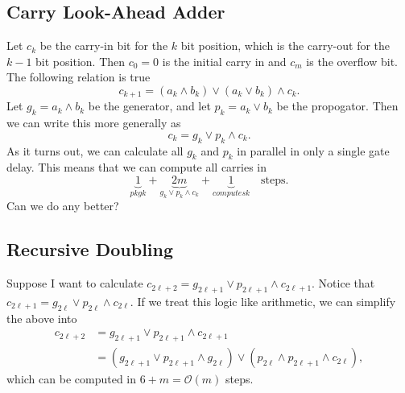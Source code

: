 \subsection*{Carry Look-Ahead Adder}

Let $c_k$ be the carry-in bit for the $k$ bit position, which is the carry-out for the $k-1$ bit position. Then $c_0 = 0$ is the initial carry in and $c_m$ is the overflow bit. The following relation is true
\[ c_{k+1} = (a_k \land b_k) \lor (a_k \lor b_k) \land c_k. \]
Let $g_k = a_k \land b_k$ be the generator, and let $p_k = a_k \lor b_k$ be the propogator. Then we can write this more generally as 
\[ c_k = g_k \lor p_k \land c_k. \]
As it turns out, we can calculate all $g_k$ and $p_k$ in parallel in only a single gate delay. This means that we can compute all carries in \[\underbrace{1}_{pkgk} + \underbrace{2m}_{g_k \lor p_k \land c_k} +\underbrace{1}_{compute sk} \quad \text{steps.} \]
Can we do any better?

\subsection*{Recursive Doubling}

Suppose I want to calculate $c_{2\ell + 2} = g_{2\ell + 1} \lor p_{2\ell + 1} \land c_{2\ell + 1}$. Notice that $c_{2\ell + 1} = g_{2\ell} \lor p_{2\ell} \land c_{2\ell}$. If we treat this logic like arithmetic, we can simplify the above into
\begin{align*}
c_{2\ell + 2} &= g_{2\ell + 1} \lor p_{2\ell + 1} \land c_{2\ell + 1} \\
&= (g_{2\ell + 1} \lor p_{2\ell + 1} \land g_{2\ell}) \lor (p_{2\ell} \land p_{2\ell+1}  \land c_{2\ell}),
\end{align*}
which can be computed in $6+m = \mathcal{O}(m)$ steps. 